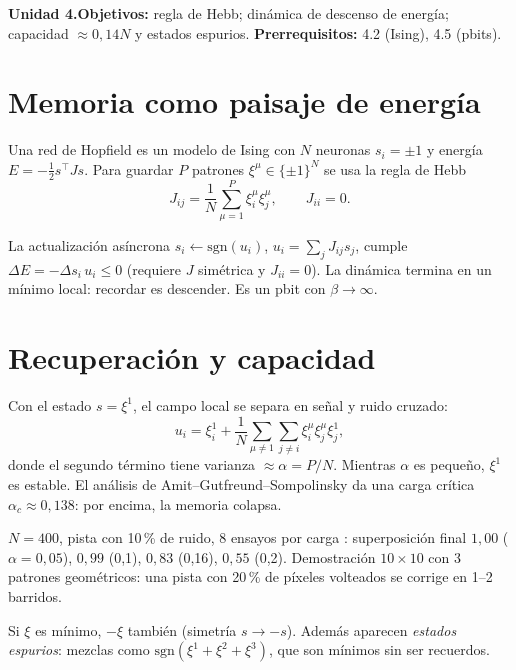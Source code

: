 \documentclass[11pt,a4paper]{article}
\begin{document}

\noindent\textbf{Unidad 4.}\quad\textbf{Objetivos:} regla de Hebb; dinámica de descenso de energía; capacidad $\approx0{,}14N$ y estados espurios.
\textbf{Prerrequisitos:} 4.2 (Ising), 4.5 (pbits).

\section{Memoria como paisaje de energía}
Una red de Hopfield \cite{hopfield} es un modelo de Ising con $N$ neuronas $s_i=\pm1$ y energía $E=-\tfrac12s^\top Js$. Para guardar $P$ patrones
$\xi^\mu\in\{\pm1\}^N$ se usa la regla de Hebb
\begin{equation}
J_{ij}=\frac1N\sum_{\mu=1}^P\xi_i^\mu\xi_j^\mu,\qquad J_{ii}=0 .
\end{equation}
\begin{resultado}
La actualización asíncrona $s_i\leftarrow\mathrm{sgn}(u_i)$, $u_i=\sum_jJ_{ij}s_j$, cumple $\Delta E=-\Delta s_i\,u_i\le0$ (requiere $J$ simétrica y $J_{ii}=0$). La dinámica
termina en un mínimo local: recordar es descender. Es un pbit con $\beta\to\infty$.
\end{resultado}

\section{Recuperación y capacidad}
Con el estado $s=\xi^1$, el campo local se separa en señal y ruido cruzado:
\begin{equation}
u_i=\xi_i^1+\frac1N\sum_{\mu\ne1}\sum_{j\ne i}\xi_i^\mu\xi_j^\mu\xi_j^1,
\end{equation}
donde el segundo término tiene varianza $\approx\alpha=P/N$. Mientras $\alpha$ es pequeño, $\xi^1$ es estable. El análisis de Amit--Gutfreund--Sompolinsky
da una carga crítica $\alpha_c\approx0{,}138$: por encima, la memoria colapsa.
\begin{ejemplo}
$N=400$, pista con 10\,\% de ruido, 8 ensayos por carga \evS: superposición final $1{,}00$ ($\alpha=0{,}05$), $0{,}99$ (0,1), $0{,}83$ (0,16),
$0{,}55$ (0,2). Demostración $10\times10$ con 3 patrones geométricos: una pista con 20\,\% de píxeles volteados se corrige en 1--2 barridos.
\end{ejemplo}
\begin{intuicion}
Si $\xi$ es mínimo, $-\xi$ también (simetría $s\to-s$). Además aparecen \emph{estados espurios}: mezclas como $\mathrm{sgn}(\xi^1+\xi^2+\xi^3)$, que son
mínimos sin ser recuerdos.
\end{intuicion}
\end{document}

